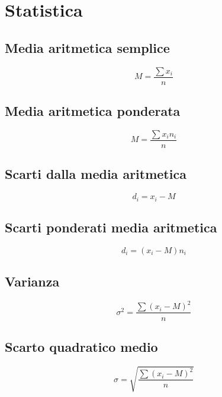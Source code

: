 \chapter{Statistica}
\section{Media aritmetica semplice}
\begin{equation*}
M=\dfrac{\sum x_i}{n}
\end{equation*}
\section{Media aritmetica ponderata}
\begin{equation*}
M=\dfrac{\sum x_i n_i}{n}
\end{equation*}
\section{Scarti dalla media aritmetica}
\begin{equation*}
d_i=x_i-M
\end{equation*}
\section{Scarti ponderati media aritmetica}
\begin{equation*}
d_i=(x_i-M)n_i
\end{equation*}
\section{Varianza}
\begin{equation*}
\sigma^2=\dfrac{\sum(x_i-M)^2}{n}
\end{equation*}
\section{Scarto quadratico medio}
\begin{equation*}
\sigma=\sqrt{\dfrac{\sum(x_i-M)^2}{n}}
\end{equation*}